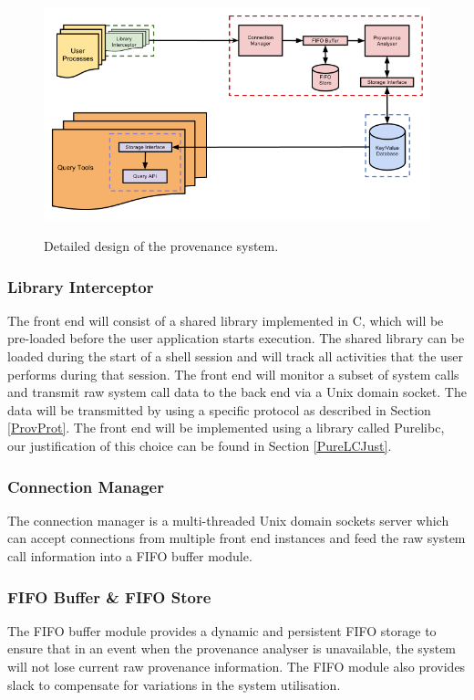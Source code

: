 \begin{figure}
\includegraphics[width=\textwidth]{res/ProvDesign.png}
\label{fig:detdes}
\caption{Detailed design of the provenance system.}
\end{figure}

\subsubsection{Library Interceptor}
The front end will consist of a shared library implemented in C, which will be pre-loaded before the user application starts execution. The shared library can be loaded during the start of a shell session and will track all activities that the user performs during that session. The front end will monitor a subset of system calls and transmit raw system call data to the back end via a Unix domain socket. The data will be transmitted by using a specific protocol as described in Section \ref{ProvProt}. The front end will be implemented using a library called Purelibc, our justification of this choice can be found in Section \ref{PureLCJust}.

\subsubsection{Connection Manager}
The connection manager is a multi-threaded Unix domain sockets server which can accept connections from multiple front end instances and feed the raw system call information into a FIFO buffer module.

\subsubsection{FIFO Buffer \& FIFO Store}
The FIFO buffer module provides a dynamic and persistent FIFO storage to ensure that in an event when the provenance analyser is unavailable, the system will not lose current raw provenance information. The FIFO module also provides slack to compensate for variations in the system utilisation.

